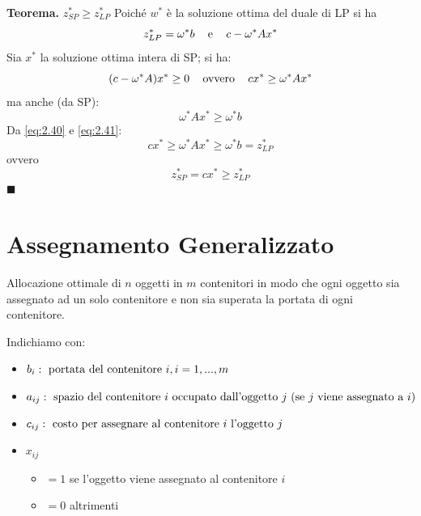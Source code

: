 \textbf{Teorema.} $z_{SP}^{*}\ge z_{LP}^{*}$
Poiché $w^{*}$ è la soluzione ottima del duale di LP si ha
\begin{equation}
	z_{LP}^{*}=\omega^{*}b\;\;\;\textnormal{ e }\;\;\;c-\omega^{*}Ax^{*}
\end{equation}
Sia $x^{*}$ la soluzione ottima intera di SP; si ha:
\begin{equation}
	\label{eq:2.40}
	(c-\omega^{*}A)x^{*}\ge 0\;\;\;\textnormal{ ovvero }\;\;\;cx^{*}\ge \omega^{*}Ax^{*} 
\end{equation}
ma anche (da SP):
\begin{equation}
	\label{eq:2.41}
	\omega^{*}Ax^{*}\ge\omega^{*}b
\end{equation}
Da \ref{eq:2.40} e \ref{eq:2.41}:
\begin{equation}
	cx^{*}\ge \omega^{*}Ax^{*}\ge\omega^{*}b=z^{*}_{LP}
\end{equation}
ovvero
\begin{equation}
	z^{*}_{SP}=cx^{*}\ge z_{LP}^{*}
\end{equation}
$\blacksquare$

\section{Assegnamento Generalizzato}
Allocazione ottimale di $n$ oggetti in $m$ contenitori in modo che ogni oggetto sia assegnato ad un solo contenitore e non sia superata la portata di ogni contenitore.

Indichiamo con:
\begin{itemize}
	\item[] $b_{i}: \textnormal{ portata del contenitore }i,i=1,...,m$
	\item[] $a_{ij}: \textnormal{ spazio del contenitore $i$ occupato dall'oggetto $j$ (se $j$ viene assegnato a $i$)}$
	\item[] $c_{ij}: \textnormal{ costo per assegnare al contenitore $i$ l'oggetto $j$}$
	\item[] $x_{ij}$ 
	\begin{itemize}
		\item[] $=1$ se l'oggetto viene assegnato al contenitore $i$
		\item[] $=0$ altrimenti
	\end{itemize}
\end{itemize}

